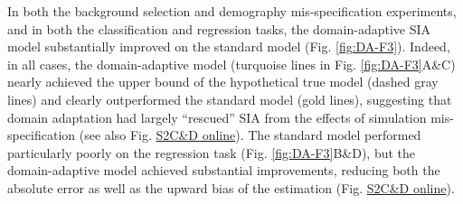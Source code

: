 In both the background selection and demography mis-specification experiments, and in both the classification and regression tasks, the domain-adaptive \ac{SIA} model substantially improved on the standard model (Fig. \ref{fig:DA-F3}). Indeed, in all cases, the domain-adaptive model (turquoise lines in Fig. \ref{fig:DA-F3}A\&C) nearly achieved the upper bound of the hypothetical true model (dashed gray lines) and clearly outperformed the standard model (gold lines), suggesting that domain adaptation had largely “rescued” \ac{SIA} from the effects of simulation mis-specification (see also Fig. \href{https://journals.plos.org/plosgenetics/article?id=10.1371/journal.pgen.1011032#sec018}{S2C\&D online}). The standard model performed particularly poorly on the regression task (Fig. \ref{fig:DA-F3}B\&D), but the domain-adaptive model achieved substantial improvements, reducing both the absolute error as well as the upward bias of the estimation (Fig. \href{https://journals.plos.org/plosgenetics/article?id=10.1371/journal.pgen.1011032#sec018}{S2C\&D online}).

